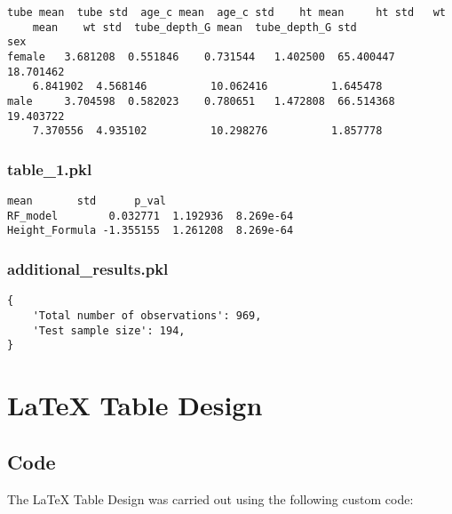 \documentclass[11pt]{article}
\begin{document}
\begin{Verbatim}[tabsize=4]
        tube mean  tube std  age_c mean  age_c std    ht mean     ht std   wt
	mean    wt std  tube_depth_G mean  tube_depth_G std
sex
female   3.681208  0.551846    0.731544   1.402500  65.400447  18.701462
	6.841902  4.568146          10.062416          1.645478
male     3.704598  0.582023    0.780651   1.472808  66.514368  19.403722
	7.370556  4.935102          10.298276          1.857778
\end{Verbatim}

\subsubsection*{table\_1.pkl}

\begin{Verbatim}[tabsize=4]
                    mean       std      p_val
RF_model        0.032771  1.192936  8.269e-64
Height_Formula -1.355155  1.261208  8.269e-64
\end{Verbatim}

\subsubsection*{additional\_results.pkl}

\begin{Verbatim}[tabsize=4]
{
    'Total number of observations': 969,
    'Test sample size': 194,
}
\end{Verbatim}

\section{LaTeX Table Design}
\subsection{{Code}}
The LaTeX Table Design was carried out using the following custom code:
\end{document}
